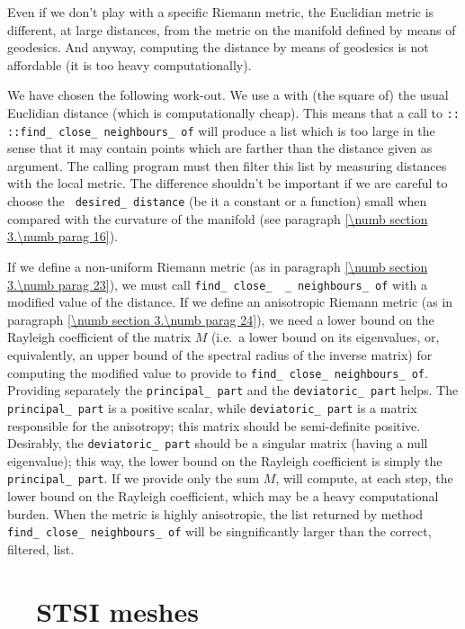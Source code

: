 Even if we don't play with a specific Riemann metric, the Euclidian metric is different,
at large distances, from the metric on the manifold defined by means of geodesics.
And anyway, computing the distance by means of geodesics is not affordable (it is too heavy
computationally).

We have chosen the following work-out.
We use a {\small\tt{}} with (the square of) the usual Euclidian distance
(which is computationally cheap).
This means that a call to {\small\tt{}:: ::find\_\,close\_\,neighbours\_\,of}
will produce a list which is too large in the sense that it may contain points which are
farther than the distance given as argument.
The calling program must then filter this list by measuring distances with the local metric.
The difference shouldn't be important if we are careful to choose the {\small\tt
desired\_\,distance} (be it a constant or a function) small when compared with the curvature
of the manifold (see paragraph \ref{\numb section 3.\numb parag 16}).

If we define a non-uniform Riemann metric
(as in paragraph \ref{\numb section 3.\numb parag 23}),
we must call {\small\tt find\_\,close\_\, \_\,neighbours\_\,of} with a modified value of the
distance.
If we define an anisotropic Riemann metric
(as in paragraph \ref{\numb section 3.\numb parag 24}),
we need a lower bound on the Rayleigh coefficient of the matrix $M$ (i.e.\ a lower bound
on its eigenvalues, or, equivalently, an upper bound of the spectral radius of the inverse
matrix) for computing the modified value to provide to {\small\tt find\_\,close\_\,neighbours\_\,of}.
Providing separately the {\small\tt principal\_\,part} and the {\small\tt deviatoric\_\,part} helps.
The {\small\tt principal\_\,part} is a positive scalar, while {\small\tt deviatoric\_\,part} is
a matrix responsible for the anisotropy; this matrix should be semi-definite positive.
Desirably, the {\small\tt deviatoric\_\,part} should be a singular matrix (having a null eigenvalue);
this way, the lower bound on the Rayleigh coefficient is simply the {\small\tt principal\_\,part}.
If we provide only the sum $M$, {\maniFEM} will compute, at each step, the lower bound on the
Rayleigh coefficient, which may be a heavy computational burden.
When the metric is highly anisotropic, the list returned by method
{\small\tt find\_\,close\_\,neighbours\_\,of} will be singnificantly larger than the correct,
filtered, list.


\section{~~STSI meshes}\label{\numb section 12.\numb parag 12}


